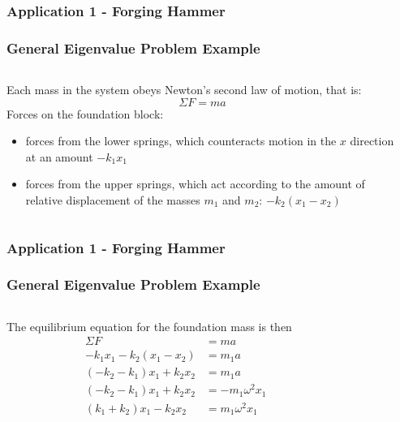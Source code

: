 \documentclass[fleqn]{beamer} %
\newcommand{\sectionIIsubsectionIIItitle}{Application 1 - Forging Hammer}
\begin{document}
			\begin{frame}
				\frametitle{\sectionIIsubsectionIIItitle}\small
				\bigskip

				  \frametitle{General Eigenvalue Problem Example}

				  \begin{columns}
				    \begin{column}{0.7\textwidth}
				      Each mass in the system obeys Newton's second law of motion,
				      that is:
				      \begin{displaymath}
				        \Sigma F = m a
				      \end{displaymath}
				      Forces on the foundation block:
				      \begin{itemize}
				      \item forces from the lower springs, which counteracts motion in
				        the $x$ direction at an amount $-k_1 x_1$
				      \item forces from the upper springs, which act according to the
				        amount of relative displacement of the masses $m_1$ and $m_2$:
				        $-k_2 (x_1 - x_2)$
				      \end{itemize}
				    \end{column}
				    \begin{column}{0.3\textwidth}
				    \end{column}
				  \end{columns}

				\btVFill 
			\end{frame}

			\begin{frame}
				\frametitle{\sectionIIsubsectionIIItitle}\small
				\bigskip

				  \frametitle{General Eigenvalue Problem Example}

				  \begin{columns}
				    \begin{column}{0.7\textwidth}
				      The equilibrium equation for the foundation mass is then
				      \begin{align*}
				        \Sigma F &= m a \\
				        -k_1 x_1 -k_2 (x_1 - x_2) &= m_1 a \\
				        (-k_2 - k_1) x_1 + k_2 x_2 &= m_1 a \\
				        (-k_2 - k_1) x_1 + k_2 x_2 &= -m_1 \omega^2 x_1 \\
				        (k_1 + k_2) x_1 - k_2 x_2 &= m_1 \omega^2 x_1
				      \end{align*}
				    \end{column}
				    \begin{column}{0.3\textwidth}
				      \pgfimage[width=0.9\textwidth]{images/fig41b}
				    \end{column}
				  \end{columns}

				\btVFill 
			\end{frame}
\end{document}
